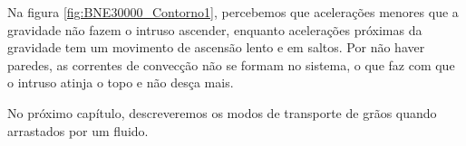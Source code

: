     Na figura \ref{fig:BNE30000_Contorno1}, percebemos que acelerações menores que a gravidade não fazem o intruso ascender, enquanto acelerações próximas da gravidade tem um movimento de ascensão lento e em saltos. Por não haver paredes, as correntes de convecção não se formam no sistema, o que faz com que o intruso atinja o topo e não desça mais.


    No próximo capítulo, descreveremos os modos de transporte de grãos quando arrastados por um fluido.
